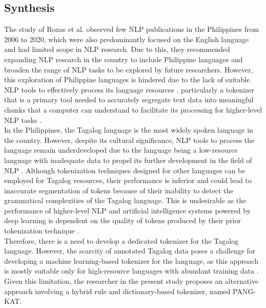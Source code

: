 \documentclass[journal]{./IEEE/IEEEtran}
\begin{document}
\newpage

\subsection {Synthesis}

The study of Roxas et al. {\cite{NLPInPH}} observed few NLP publications in the Philippines from 2006 to 2020, which were also predominantly focused on the English language and had limited scope in NLP research. Due to this, they recommended expanding NLP research in the country to include Philippine languages and broaden the range of NLP tasks to be explored by future researchers. However, this exploration of Philippine languages is hindered due to the lack of suitable NLP tools to effectively process its language resources {\cite{TweetTaglish}}, particularly a tokenizer that is a primary tool needed to accurately segregate text data into meaningful chunks that a computer can understand to facilitate its processing for higher-level NLP tasks {\cite{Cutter}}. \\

In the Philippines, the Tagalog language is the most widely spoken language in the country. However, despite its cultural significance, NLP tools to process the language remain underdeveloped due to the language being a low-resource language with inadequate data to propel its further development in the field of NLP {\cite{TweetTaglish}}. Although tokenization techniques designed for other languages can be employed for Tagalog resources, their performance is inferior and could lead to inaccurate segmentation of tokens because of their inability to detect the grammatical complexities of the Tagalog language. This is undesirable as the performance of higher-level NLP and artificial intelligence systems powered by deep learning is dependent on the quality of tokens produced by their prior tokenization technique {\cite{TokenizationInKnowledge}}. \\

Therefore, there is a need to develop a dedicated tokenizer for the Tagalog language. However, the scarcity of annotated Tagalog data {\cite{TweetTaglish}} poses a challenge for developing a machine learning-based tokenizer for the language, as this approach is mostly suitable only for high-resource languages with abundant training data {\cite{ChemTok}}{\cite{Cutter}}. Given this limitation, the researcher in the present study proposes an alternative approach involving a hybrid rule and dictionary-based tokenizer, named PANG-KAT. \\
\end{document}
